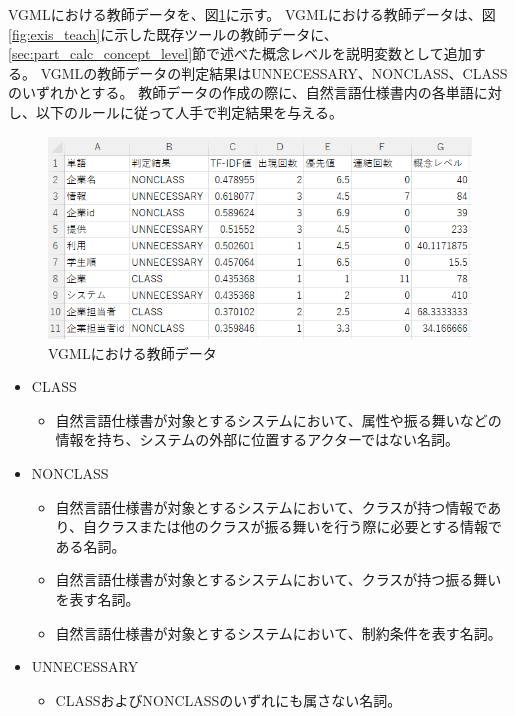 VGMLにおける教師データを、図\ref{fig:vgml_teach}に示す。
VGMLにおける教師データは、図\ref{fig:exis_teach}に示した既存ツールの教師データに、\ref{sec:part_calc_concept_level}節で述べた概念レベルを説明変数として追加する。
VGMLの教師データの判定結果はUNNECESSARY、NONCLASS、CLASSのいずれかとする。
教師データの作成の際に、自然言語仕様書内の各単語に対し、以下のルールに従って人手で判定結果を与える。

\begin{figure}[t]
    \begin{center}
        \includegraphics[width=1.0\columnwidth]{image/vgml_teach.png}
        \caption{VGMLにおける教師データ}
        \label{fig:vgml_teach}
    \end{center}
\end{figure}

\begin{itemize}
    \item CLASS
        \begin{itemize}
            \item 自然言語仕様書が対象とするシステムにおいて、属性や振る舞いなどの情報を持ち、システムの外部に位置するアクターではない名詞。
        \end{itemize}
    \item NONCLASS
        \begin{itemize}
            \item 自然言語仕様書が対象とするシステムにおいて、クラスが持つ情報であり、自クラスまたは他のクラスが振る舞いを行う際に必要とする情報である名詞。
            \item 自然言語仕様書が対象とするシステムにおいて、クラスが持つ振る舞いを表す名詞。
            \item 自然言語仕様書が対象とするシステムにおいて、制約条件を表す名詞。
        \end{itemize}
    \item UNNECESSARY
        \begin{itemize}
            \item CLASSおよびNONCLASSのいずれにも属さない名詞。
        \end{itemize}
\end{itemize}

